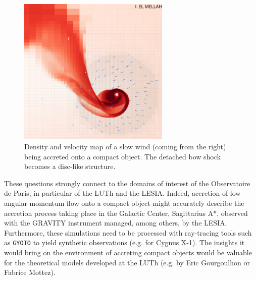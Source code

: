 \documentclass[a4paper,12pt,onecolumn]{article}
\makeatletter
\newcommand{\sgx}{SgXB\xspace}
\newcommand*{\eg}{e.g.\@\xspace}
\makeatother
\begin{document}
\begin{figure}
\vspace*{-0.5cm}
\hspace*{0.1cm}
\includegraphics[height=7.1cm]{Figures/wind-RLOF.png}
\caption{Density and velocity map of a slow wind (coming from the right) being accreted onto a compact object. The detached bow shock becomes a disc-like structure.}
\label{fig:wind-RLOF}
\end{figure} 


\indent These questions strongly connect to the domains of interest of the Observatoire de Paris, in particular of the LUTh and the LESIA. Indeed, accretion of low angular momentum flow onto a compact object might accurately describe the accretion process taking place in the Galactic Center, Sagittarius A*, observed with the GRAVITY instrument managed, among others, by the LESIA. Furthermore, these simulations need to be processed with ray-tracing tools such as \texttt{GYOTO} \citep[developed among others by Fr\'ed\'eric Vincent now at the LESIA,][]{Vincent2011} to yield synthetic observations (\eg for Cygnus X-1). The insights it would bring on the environment of accreting compact objects would be valuable for the theoretical models developed at the LUTh (\eg by Eric Gourgoulhon or Fabrice Mottez). 
\end{document}
